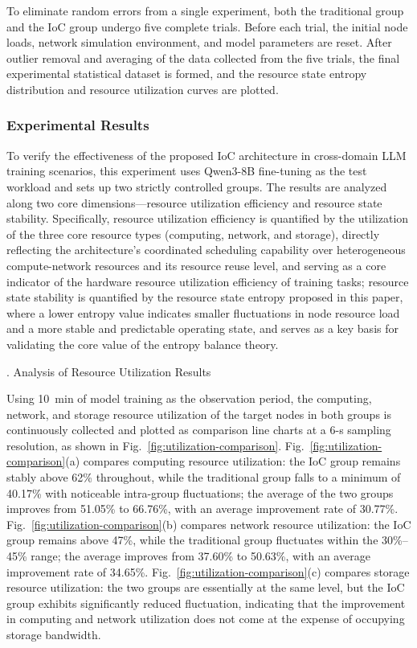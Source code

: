 \documentclass{ccjnl}
\begin{document}
To eliminate random errors from a single experiment, both the traditional group and the IoC group undergo five complete trials. Before each trial, the initial node loads, network simulation environment, and model parameters are reset. After outlier removal and averaging of the data collected from the five trials, the final experimental statistical dataset is formed, and the resource state entropy distribution and resource utilization curves are plotted.

\subsubsection{Experimental Results}
\label{s6-1-3}

To verify the effectiveness of the proposed IoC architecture in cross-domain LLM training scenarios, this experiment uses Qwen3-8B fine-tuning as the test workload and sets up two strictly controlled groups. The results are analyzed along two core dimensions—resource utilization efficiency and resource state stability. Specifically, resource utilization efficiency is quantified by the utilization of the three core resource types (computing, network, and storage), directly reflecting the architecture's coordinated scheduling capability over heterogeneous compute-network resources and its resource reuse level, and serving as a core indicator of the hardware resource utilization efficiency of training tasks; resource state stability is quantified by the resource state entropy proposed in this paper, where a lower entropy value indicates smaller fluctuations in node resource load and a more stable and predictable operating state, and serves as a key basis for validating the core value of the entropy balance theory.

. Analysis of Resource Utilization Results

Using 10~min of model training as the observation period, the computing, network, and storage resource utilization of the target nodes in both groups is continuously collected and plotted as comparison line charts at a 6-s sampling resolution, as shown in Fig.~\ref{fig:utilization-comparison}. Fig.~\ref{fig:utilization-comparison}(a) compares computing resource utilization: the IoC group remains stably above 62\% throughout, while the traditional group falls to a minimum of 40.17\% with noticeable intra-group fluctuations; the average of the two groups improves from 51.05\% to 66.76\%, with an average improvement rate of 30.77\%. Fig.~\ref{fig:utilization-comparison}(b) compares network resource utilization: the IoC group remains above 47\%, while the traditional group fluctuates within the 30\%--45\% range; the average improves from 37.60\% to 50.63\%, with an average improvement rate of 34.65\%. Fig.~\ref{fig:utilization-comparison}(c) compares storage resource utilization: the two groups are essentially at the same level, but the IoC group exhibits significantly reduced fluctuation, indicating that the improvement in computing and network utilization does not come at the expense of occupying storage bandwidth.
\end{document}
